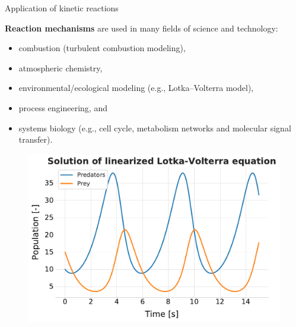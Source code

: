 \begin{frame}{Application of kinetic reactions}
	
 \alert{\bf Reaction mechanisms} are used in many fields of science and technology: 

\lcol
{
\begin{itemize}
	\item combustion (turbulent combustion modeling),
	\item atmospheric chemistry,
	\item environmental/ecological modeling (e.g., Lotka--Volterra model), 
	\item process engineering, and 
	\item systems biology (e.g., cell cycle, metabolism networks and molecular signal transfer).
\end{itemize}
}

\rcol

\begin{figure}
	\vskip 10pt
	\centering
	\includegraphics[height=0.6\columnwidth]{figures/chemical-kinetics/lotka-volterra}
\end{figure}

\ecol
\end{frame}
%
%
